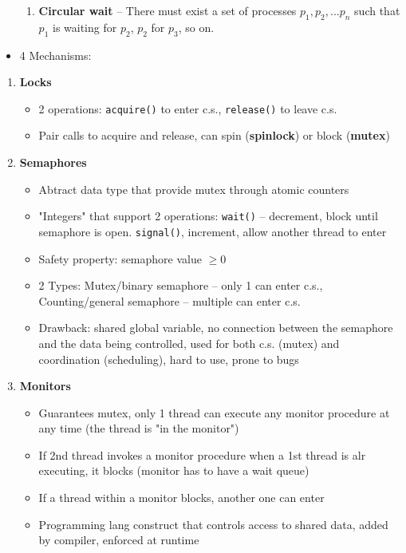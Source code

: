 \documentclass[10pt,landscape,a4paper]{article}
\begin{document}
\begin{multicols*}{4}
\begin{itemize}
\begin{enumerate}
      \item \textbf{Circular wait} -- There must exist a set of processes $p_1, p_2, ... p_n$ such that $p_1$ is waiting for $p_2$, $p_2$ for $p_3$, so on.
    \end{enumerate}
    \item 4 Mechanisms:
  \end{itemize}
  \begin{enumerate}
    \item \textbf{Locks}
    \begin{itemize}
      \item 2 operations: \texttt{acquire()} to enter c.s., \texttt{release()} to leave c.s.
      \item Pair calls to acquire and release, can spin (\textbf{spinlock}) or block (\textbf{mutex})
    \end{itemize}
    \item \textbf{Semaphores}
    \begin{itemize}
      \item Abtract data type that provide mutex through atomic counters
      \item "Integers" that support 2 operations: \texttt{wait()} -- decrement, block until semaphore is open. \texttt{signal()}, increment, allow another thread to enter
      \item Safety property: semaphore value $\geq 0$
      \item 2 Types: Mutex/binary semaphore -- only 1 can enter c.s., Counting/general semaphore -- multiple can enter c.s.
      \item Drawback: shared global variable, no connection between the semaphore and the data being controlled, used for both c.s. (mutex) and coordination (scheduling), hard to use, prone to bugs
    \end{itemize}
    \item \textbf{Monitors}
    \begin{itemize}
      \item Guarantees mutex, only 1 thread can execute any monitor procedure at any time (the thread is "in the monitor")
      \item If 2nd thread invokes a monitor procedure when a 1st thread is alr executing, it blocks (monitor has to have a wait queue)
      \item If a thread within a monitor blocks, another one can enter
      \item Programming lang construct that controls access to shared data, added by compiler, enforced at runtime

\end{itemize}
\end{enumerate}
\end{multicols*}
\end{document}

